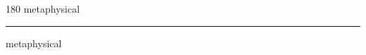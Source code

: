 
\begin{frame}
\begin{center}
\begin{turn}{180}
{\fontsize{2.5cm}{1em}\selectfont metaphysical}
\end{turn}
\vspace{1em}\par  
\hrule
\vspace{1em}\par  
{\fontsize{2.5cm}{1em}\selectfont metaphysical}
\end{center}
\end{frame}
